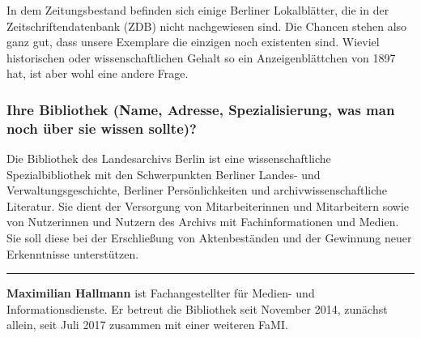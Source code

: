In dem Zeitungsbestand befinden sich einige Berliner Lokalblätter, die
in der Zeitschriftendatenbank (ZDB) nicht nachgewiesen sind. Die Chancen
stehen also ganz gut, dass unsere Exemplare die einzigen noch existenten
sind. Wieviel historischen oder wissenschaftlichen Gehalt so ein
Anzeigenblättchen von 1897 hat, ist aber wohl eine andere Frage.

\hypertarget{ihre-bibliothek-name-adresse-spezialisierung-was-man-noch-uxfcber-sie-wissen-sollte}{%
\subsubsection*{Ihre Bibliothek (Name, Adresse, Spezialisierung, was man noch
über sie wissen
sollte)?}\label{ihre-bibliothek-name-adresse-spezialisierung-was-man-noch-uxfcber-sie-wissen-sollte}}

Die Bibliothek des Landesarchivs Berlin ist eine wissenschaftliche
Spezialbibliothek mit den Schwerpunkten Berliner Landes- und
Verwaltungsgeschichte, Berliner Persönlichkeiten und
archivwissenschaftliche Literatur. Sie dient der Versorgung von
Mitarbeiterinnen und Mitarbeitern sowie von Nutzerinnen und Nutzern des
Archivs mit Fachinformationen und Medien. Sie soll diese bei der
Erschließung von Aktenbeständen und der Gewinnung neuer Erkenntnisse
unterstützen.

\begin{center}\rule{0.5\linewidth}{\linethickness}\end{center}

\textbf{Maximilian Hallmann} ist Fachangestellter für Medien- und
Informationsdienste. Er betreut die Bibliothek seit November 2014,
zunächst allein, seit Juli 2017 zusammen mit einer weiteren FaMI.